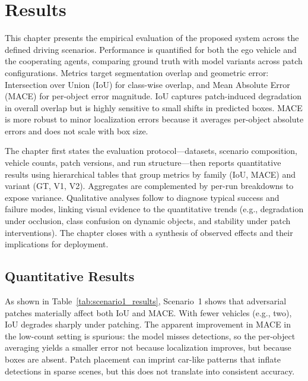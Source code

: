 \chapter{Results}
\label{results}

This chapter presents the empirical evaluation of the proposed system across the defined driving scenarios.
Performance is quantified for both the ego vehicle and the cooperating agents, comparing ground truth with model variants across patch configurations.
Metrics target segmentation overlap and geometric error: Intersection over Union (IoU) for class-wise overlap, and Mean Absolute Error (MACE) for per-object error magnitude.
IoU captures patch-induced degradation in overall overlap but is highly sensitive to small shifts in predicted boxes.
MACE is more robust to minor localization errors because it averages per-object absolute errors and does not scale with box size.

The chapter first states the evaluation protocol—datasets, scenario composition, vehicle counts, patch versions, and run structure—then reports quantitative results using hierarchical tables that group metrics by family (IoU, MACE) and variant (GT, V1, V2). 
Aggregates are complemented by per-run breakdowns to expose variance. Qualitative analyses follow to diagnose typical success and failure modes, linking visual evidence to the quantitative trends (e.g., degradation under occlusion, class confusion on dynamic objects, and stability under patch interventions). The chapter closes with a synthesis of observed effects and their implications for deployment.

\section{Quantitative Results}
\label{sec:quantitative_results}

As shown in Table~\ref{tab:scenario1_results}, Scenario~1 shows that adversarial patches materially affect both IoU and MACE.
With fewer vehicles (e.g., two), IoU degrades sharply under patching.
The apparent improvement in MACE in the low-count setting is spurious: the model misses detections, so the per-object averaging yields a smaller error not because localization improves, but because boxes are absent.
Patch placement can imprint car-like patterns that inflate detections in sparse scenes, but this does not translate into consistent accuracy.

